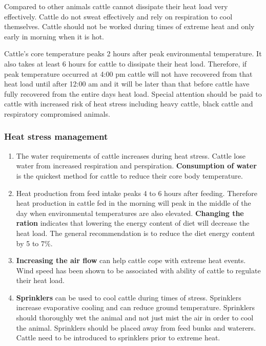\documentclass[]{book}
\begin{document}
Compared to other animals cattle cannot dissipate their heat load very
effectively. Cattle do not sweat effectively and rely on respiration to
cool themselves. Cattle should not be worked during times of extreme
heat and only early in morning when it is hot.

Cattle's core temperature peaks 2 hours after peak environmental
temperature. It also takes at least 6 hours for cattle to dissipate
their heat load. Therefore, if peak temperature occurred at 4:00 pm
cattle will not have recovered from that heat load until after 12:00 am
and it will be later than that before cattle have fully recovered from
the entire days heat load. Special attention should be paid to cattle
with increased risk of heat stress including heavy cattle, black cattle
and respiratory compromised animals.

\subsubsection{Heat stress management}\label{heat-stress-management}

\begin{enumerate}
\def\labelenumi{\arabic{enumi}.}
\item
  The water requirements of cattle increases during heat stress. Cattle
  lose water from increased respiration and perspiration.
  \textbf{Consumption of water} is the quickest method for cattle to
  reduce their core body temperature.
\item
  Heat production from feed intake peaks 4 to 6 hours after feeding.
  Therefore heat production in cattle fed in the morning will peak in
  the middle of the day when environmental temperatures are also
  elevated. \textbf{Changing the ration} indicates that lowering the
  energy content of diet will decrease the heat load. The general
  recommendation is to reduce the diet energy content by 5 to 7\%.
\item
  \textbf{Increasing the air flow} can help cattle cope with extreme
  heat events. Wind speed has been shown to be associated with ability
  of cattle to regulate their heat load.
\item
  \textbf{Sprinklers} can be used to cool cattle during times of stress.
  Sprinklers increase evaporative cooling and can reduce ground
  temperature. Sprinklers should thoroughly wet the animal and not just
  mist the air in order to cool the animal. Sprinklers should be placed
  away from feed bunks and waterers. Cattle need to be introduced to
  sprinklers prior to extreme heat.
\end{enumerate}
\end{document}
